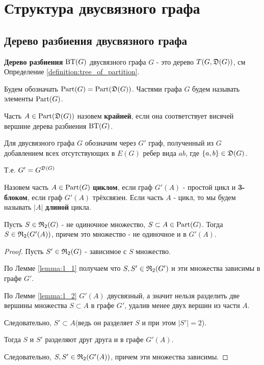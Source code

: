 
\section{Структура двусвязного графа}

\subsection{Дерево разбиения двусвязного графа}


\begin{df}
	\textbf{Дерево разбиения} $\operatorname{BT}(G)$ двусвязного графа  $G$ - это дерево  $T(G, \mathfrak{D}(G))$, см Определение \ref{definition:tree_of_partition}.

	Будем обозначать $\operatorname{Part}(G) = \operatorname{Part}(\mathfrak{D}(G))$.
	Частями графа  $G$ будем называть элементы  $\operatorname{Part}(G)$.
\end{df}

\begin{df}
	Часть $A \in \operatorname{Part}(\mathfrak{D}(G))$ назовем \textbf{крайней}, если она соответствует висячей вершине дерева разбиения  $\operatorname{BT}(G)$.
\end{df}

\begin{df}[G']
	Для двусвязного графа $G$ обозначим через $G'$ граф, полученный из $G$ добавлением всех отсутствующих в $E(G)$ ребер вида $ab$, где $\{a, b\} \in \mathfrak{D}(G)$.

	Т.е. $G' = G^{\mathfrak{D}(G)}$
\end{df}

\begin{df}
	Назовем часть $A \in \operatorname{Part}(G)$ \textbf{циклом}, если граф $G'(A)$ - простой цикл и \textbf{3-блоком}, если граф $G'(A)$ трёхсвязен.
	Если часть $A$ - цикл, то мы будем называть $|A|$ \textbf{длиной} цикла.
\end{df}

\begin{lm}[Лемма 2.2] \label{lemma:2_2}
	Пусть $S \in \mathfrak{R}_2(G)$ - не одиночное множество, $S \subset A \in \operatorname{Part}(G)$. 
	Тогда $S \in \mathfrak{R}_2(G'(A))$, причем это множество - не одиночное и в  $G'(A)$.
\end{lm}

\begin{proof}
	Пусть $S' \in \mathfrak{R}_2(G)$ - зависимое с  $S$ множество.

	По Лемме \ref{lemma:1_1} получаем что $S, S' \in \mathfrak{R}_2(G')$ и эти множества зависимы в графе $G'$.

	По Лемме \ref{lemma:1_2} $G'(A)$ двусвязный, а значит нельзя разделить две вершины множества  $S \subset A$ в графе  $G'$, удалив менее двух вершин из части  $A$.

	Следовательно,  $S' \subset A$(ведь он разделяет $S$ и при этом $|S'| = 2$).

	Тогда $S$ и  $S'$ разделяют друг друга и в графе $G'(A)$.

	Следовательно,  $S, S' \in \mathfrak{R}_2(G'(A))$, причем эти множества зависимы.

\end{proof}

